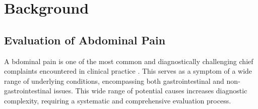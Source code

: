 \section{Background}
\subsection{Evaluation of Abdominal Pain}
\label{sec:abdominal_pain}
\lettrine{A}{ }bdominal pain is one of the most common and diagnostically challenging chief complaints encountered in clinical practice \cite{gans2015guideline}. This serves as a symptom of a wide range of underlying conditions, encompassing both gastrointestinal and non-gastrointestinal issues. This wide range of potential causes increases diagnostic complexity, requiring a systematic and comprehensive evaluation process.\\[\baselineskip]

